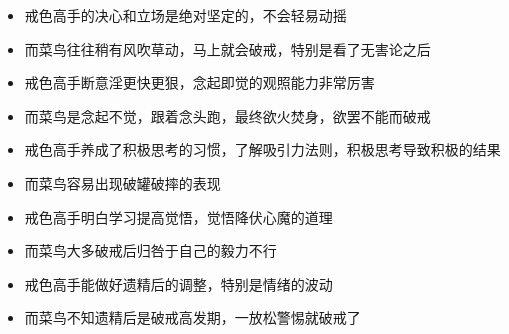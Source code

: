 \begin{paracol}{2}
    \begin{itemize}
        \item 戒色高手的决心和立场是绝对坚定的，不会轻易动摇
    \end{itemize}
    \switchcolumn
    \begin{itemize}
        \item 而菜鸟往往稍有风吹草动，马上就会破戒，特别是看了无害论之后
    \end{itemize}
    \switchcolumn*

    \begin{itemize}
        \item 戒色高手断意淫更快更狠，念起即觉的观照能力非常厉害
    \end{itemize}
    \switchcolumn
    \begin{itemize}
        \item 而菜鸟是念起不觉，跟着念头跑，最终欲火焚身，欲罢不能而破戒
    \end{itemize}
    \switchcolumn*

    \begin{itemize}
        \item 戒色高手养成了积极思考的习惯，了解吸引力法则，积极思考导致积极的结果
    \end{itemize}
    \switchcolumn
    \begin{itemize}
        \item 而菜鸟容易出现破罐破摔的表现
    \end{itemize}
    \switchcolumn*

    \begin{itemize}
        \item 戒色高手明白学习提高觉悟，觉悟降伏心魔的道理
    \end{itemize}
    \switchcolumn
    \begin{itemize}
        \item 而菜鸟大多破戒后归咎于自己的毅力不行
    \end{itemize}
    \switchcolumn*

    \begin{itemize}
        \item 戒色高手能做好遗精后的调整，特别是情绪的波动
    \end{itemize}
    \switchcolumn
    \begin{itemize}
        \item 而菜鸟不知遗精后是破戒高发期，一放松警惕就破戒了
    \end{itemize}
    \switchcolumn*


\end{paracol}

